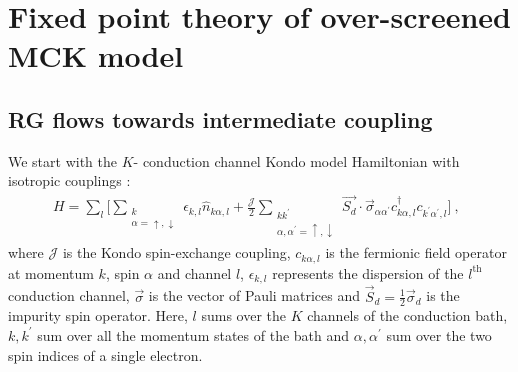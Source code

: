 \documentclass[reprint,prb,superscriptaddress]{revtex4-2}
\begin{document}
\section{Fixed point theory of over-screened MCK model}
\label{rg_section}
\subsection{RG flows towards intermediate coupling}
\label{rg_flow_section}
We start with the \(K\)- conduction channel Kondo model Hamiltonian with isotropic couplings \cite{Noz_blandin_1980}:
\begin{gather}
	\label{mc_ham}
	H = \sum_l\bigg[\sum_{\substack{k\\\alpha=\uparrow,\downarrow}}\epsilon_{k,l} \hat n_{k\alpha,l} + \frac{\mathcal{J}}{2}\sum_{\substack{kk^\prime\\\alpha,\alpha^\prime= \uparrow,\downarrow}} \vec{S_d}\cdot\vec{\sigma}_{\alpha\alpha^\prime}c_{k\alpha,l}^\dagger c_{k^\prime\alpha^\prime, l}\bigg]~,~~
\end{gather}
where \(\mathcal{J}\) is the Kondo spin-exchange coupling, \(c_{k\alpha,l}\) is the fermionic field operator at momentum \(k\), spin \(\alpha\) and channel \(l\), \(\epsilon_{k,l}\) represents the dispersion of the \(l^\text{th}\) conduction channel, \(\vec \sigma\) is the vector of Pauli matrices and \(\vec S_d = \frac{1}{2}\vec \sigma_d\) is the impurity spin operator. Here, \(l\) sums over the \(K\) channels of the conduction bath, \(k,k^\prime\) sum over all the momentum states of the bath and \(\alpha,\alpha^\prime\) sum over the two spin indices of a single electron.
\end{document}
